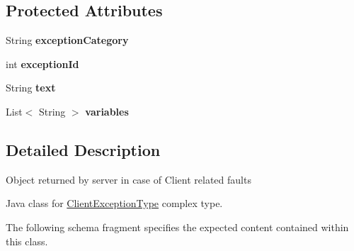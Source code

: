 \subsection*{Protected Attributes}
\begin{DoxyCompactItemize}
\item 
\hypertarget{classcom_1_1telefonica_1_1schemas_1_1unica_1_1rest_1_1common_1_1v1_1_1ClientExceptionType_aa0fd50d113eac43ded47a38aaa1ee8b4}{
String {\bfseries exceptionCategory}}
\label{classcom_1_1telefonica_1_1schemas_1_1unica_1_1rest_1_1common_1_1v1_1_1ClientExceptionType_aa0fd50d113eac43ded47a38aaa1ee8b4}

\item 
\hypertarget{classcom_1_1telefonica_1_1schemas_1_1unica_1_1rest_1_1common_1_1v1_1_1ClientExceptionType_abbca764f1b460986afd2d38935185db6}{
int {\bfseries exceptionId}}
\label{classcom_1_1telefonica_1_1schemas_1_1unica_1_1rest_1_1common_1_1v1_1_1ClientExceptionType_abbca764f1b460986afd2d38935185db6}

\item 
\hypertarget{classcom_1_1telefonica_1_1schemas_1_1unica_1_1rest_1_1common_1_1v1_1_1ClientExceptionType_aa6a6937b0c21189dd95b1e940fa9ef17}{
String {\bfseries text}}
\label{classcom_1_1telefonica_1_1schemas_1_1unica_1_1rest_1_1common_1_1v1_1_1ClientExceptionType_aa6a6937b0c21189dd95b1e940fa9ef17}

\item 
\hypertarget{classcom_1_1telefonica_1_1schemas_1_1unica_1_1rest_1_1common_1_1v1_1_1ClientExceptionType_a91caace9593f52ad239741156027fad5}{
List$<$ String $>$ {\bfseries variables}}
\label{classcom_1_1telefonica_1_1schemas_1_1unica_1_1rest_1_1common_1_1v1_1_1ClientExceptionType_a91caace9593f52ad239741156027fad5}

\end{DoxyCompactItemize}


\subsection{Detailed Description}
Object returned by server in case of Client related faults

Java class for \hyperlink{classcom_1_1telefonica_1_1schemas_1_1unica_1_1rest_1_1common_1_1v1_1_1ClientExceptionType}{ClientExceptionType} complex type.

The following schema fragment specifies the expected content contained within this class.


